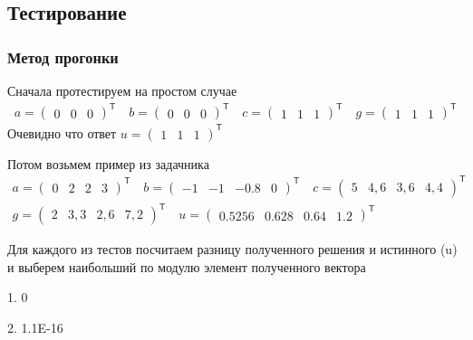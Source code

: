 \subsection{Тестирование}

\subsubsection{Метод прогонки}

Сначала протестируем на простом случае
\begin{align*}
a = \begin{pmatrix} 0 & 0 & 0 \end{pmatrix}^\mathsf{T} \quad
b = \begin{pmatrix} 0 & 0 & 0 \end{pmatrix}^\mathsf{T} \quad
c = \begin{pmatrix} 1 & 1 & 1 \end{pmatrix}^\mathsf{T} \quad
g = \begin{pmatrix} 1 & 1 & 1 \end{pmatrix}^\mathsf{T}
\end{align*}
Очевидно что ответ \(u = \begin{pmatrix} 1 & 1 & 1 \end{pmatrix}^\mathsf{T}\)

Потом возьмем пример из задачника
\begin{align*}
a = \begin{pmatrix} 0 & 2 & 2 & 3 \end{pmatrix}^\mathsf{T} \quad
b = \begin{pmatrix} -1 & -1 & -0.8 & 0 \end{pmatrix}^\mathsf{T} \quad
c = \begin{pmatrix} 5 & 4,6 & 3,6 & 4,4 \end{pmatrix}^\mathsf{T} \\
g = \begin{pmatrix} 2 & 3,3 & 2,6 & 7,2 \end{pmatrix}^\mathsf{T} \quad
u = \begin{pmatrix} 0.5256 & 0.628 & 0.64 & 1.2 \end{pmatrix}^\mathsf{T}
\end{align*}

Для каждого из тестов посчитаем разницу полученного решения и истинного (u) и выберем наибольший по модулю элемент полученного вектора

1. 0

2. 1.1E-16

